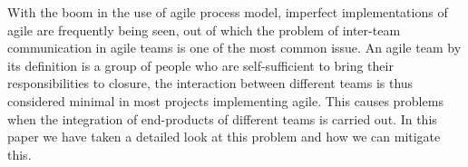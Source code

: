 With the boom in the use of agile process model, imperfect implementations of agile are frequently being seen, out of which the problem of inter-team communication in agile teams is one of the most common issue.
An agile team by its definition is a group of people who are self-sufficient to bring their responsibilities to closure, the interaction between different teams is thus considered minimal in most projects implementing agile.
This causes problems when the integration of end-products of different teams is carried out.
In this paper we have taken a detailed look at this problem and how we can mitigate this.